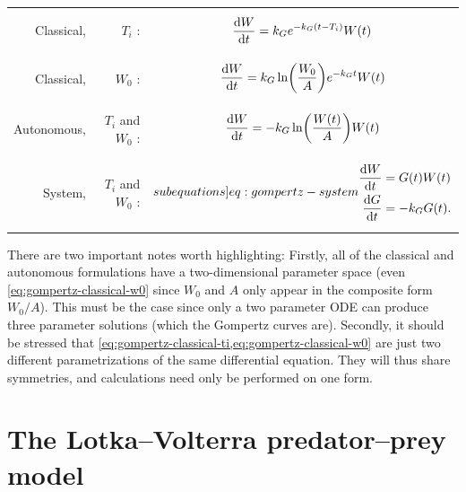 \noindent
\begin{tabularx}{\linewidth}{rrM}
  Classical, & \(T_i\) :&
  \begin{minipage}{\linewidth}
    \begin{equation}
      \diff{W}{t} = k_G e^{-k_G (t - T_i)} W(t) \label{eq:gompertz-classical-ti}
    \end{equation}
  \end{minipage}\tabularnewline
  Classical, & \(W_0\) :&
  \begin{minipage}{\linewidth}
    \begin{equation}
      \diff{W}{t} = k_G \ln\left(\frac{W_0}{A}\right)e^{-k_G t} W(t) \label{eq:gompertz-classical-w0}
    \end{equation}
  \end{minipage}\tabularnewline
  Autonomous, & \(T_i\) and \(W_0\) :&
  \begin{minipage}{\linewidth}
    \begin{equation}
      \diff{W}{t} = -k_G \ln\left(\frac{W(t)}{A}\right) W(t) \label{eq:gompertz-autonomous}
    \end{equation}
  \end{minipage}\tabularnewline
  System, & \(T_i\) and \(W_0\) :&
  \begin{minipage}{\linewidth}%
    {\begin{subequations} \label[subequations]{eq:gompertz-system}
      \begin{align}
        \diff{W}{t} &= G(t) W(t) \label{eq:gompertz-system-a}\\
        \diff{G}{t} &= -k_G G(t). \label{eq:gompertz-system-b}
      \end{align}
    \end{subequations}}%
  \end{minipage}
\end{tabularx}
There are two important notes worth highlighting:
Firstly, all of the classical and autonomous formulations have a two-dimensional parameter space (even \cref{eq:gompertz-classical-w0} since \(W_0\) and \(A\) only appear in the composite form \(W_0 / A\)).
This must be the case since only a two parameter ODE can produce three parameter solutions (which the Gompertz curves are).
Secondly, it should be stressed that \cref{eq:gompertz-classical-ti,eq:gompertz-classical-w0} are just two different parametrizations of the same differential equation.
They will thus share symmetries, and calculations need only be performed on one form.


\section{The Lotka--Volterra predator--prey model}

